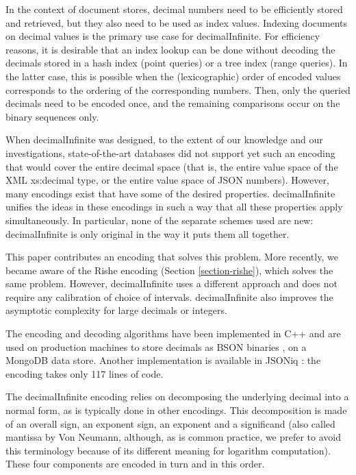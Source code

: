 \documentclass[final,leqno,onefignum,onetabnum]{siamltex1213}
\begin{document}
In the context of document stores, decimal numbers need to be efficiently stored and retrieved, but they also need to be used as index values. Indexing documents on decimal values is the primary use case for decimalInfinite. For efficiency reasons, it is desirable that an index lookup can be done without decoding the decimals stored in a hash index (point queries) or a tree index (range queries). In the latter case, this is possible when the (lexicographic) order of encoded values corresponds to the ordering of the corresponding numbers. Then, only the queried decimals need to be encoded once, and the remaining comparisons occur on the binary sequences only. 

When decimalInfinite was designed, to the extent of our knowledge and our investigations, state-of-the-art databases did not support yet such an encoding that would cover the entire decimal space (that is, the entire value space of the XML xs:decimal type, or the entire value space of JSON numbers). However, many encodings exist that have some of the desired properties. decimalInfinite unifies the ideas in these encodings in such a way that all these properties apply simultaneously. In particular, none of the separate schemes used are new: decimalInfinite is only original in the way it puts them all together.

This paper contributes an encoding that solves this problem. More recently, we became aware of the Rishe encoding (Section \ref{section-rishe}), which solves the same problem. However, decimalInfinite uses a different approach and does not require any calibration of choice of intervals. decimalInfinite also improves the asymptotic complexity for large decimals or integers.

The encoding and decoding algorithms have been implemented in C++ and are used on production machines to store decimals as BSON binaries \cite{BSON}, on a MongoDB \cite{MongoDB} data store. Another implementation is available in JSONiq \cite{decimalInfiniteJSONiq}: the encoding takes only 117 lines of code.

The decimalInfinite encoding relies on decomposing the underlying decimal into a normal form, as is typically done in other encodings. This decomposition is made of an overall sign, an exponent sign, an exponent and a significand (also called mantissa by Von Neumann, although, as is common practice, we prefer to avoid this terminology because of its different meaning for logarithm computation). These four components are encoded in turn and in this order.
\end{document}
